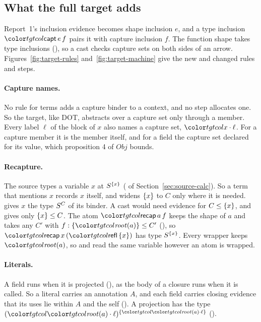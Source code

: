 \begin{figure}[t]
\label{fig:target-syntax}
\end{figure}

\subsection{What the full target adds}\label{sec:target-delta}

Report~1's inclusion evidence becomes shape inclusion $e$, and a type inclusion $\ev{capt}\,e\,f$ pairs it with capture inclusion $f$. The function shape takes type inclusions (), so a cast checks capture sets on both sides of an arrow. Figures~\ref{fig:target-rules} and~\ref{fig:target-machine} give the new and changed rules and steps.

\paragraph{Capture names.}
No rule for terms adds a capture binder to a context, and no step allocates one. So the target, like DOT, abstracts over a capture set only through a member. Every label $\ell$ of the block of $x$ also names a capture set, $\sel{x}{\ell}$. For a capture member it is the member itself, and for a field the capture set declared for its value, which proposition 4 of $\mathit{Obj}$ bounds.

\paragraph{Recapture.}
The source types a variable $x$ at $S^{\{x\}}$ ( of Section~\ref{sec:source-calc}). So a term that mentions $x$ records $x$ itself, and  widens $\{x\}$ to $C$ only where it is needed.  gives $x$ the type $S^{C}$ of its binder. A cast would need evidence for $C \le \{x\}$, and  gives only $\{x\} \le C$. The atom $\ev{recap}\,a\,f$ keeps the shape of $a$ and takes any $C'$ with $f : \cset{\rt{a}} \le C'$ (), so $\ev{recap}\,x\,(\ev{refl}\,\cset{x})$ has type $S^{\{x\}}$. Every wrapper keeps $\rt{a}$, so  and  read the same variable however an atom is wrapped.

\paragraph{Literals.}
A field runs when it is projected (), as the body of a closure runs when it is called. So a literal carries an annotation $A$, and each field carries closing evidence that its uses lie within $A$ and the self (). A projection has the type $\capt{(\sel{\rt{a}}{\ell})}{\cset{\sel{\rt{a}}{\ell}}}$ ().

